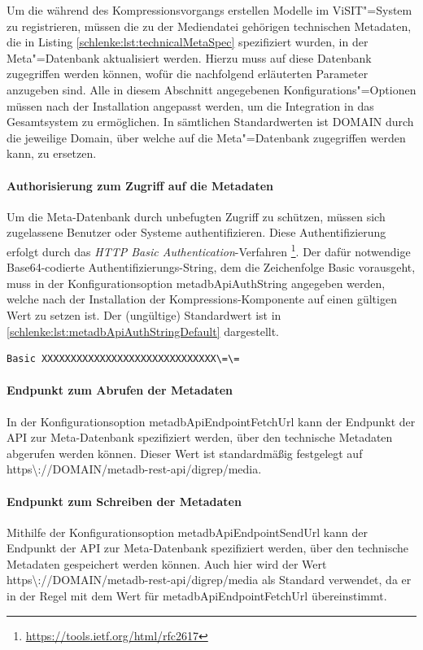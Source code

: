 Um die während des Kompressionsvorgangs erstellen Modelle im ViSIT"=System zu registrieren, müssen die zu der Mediendatei gehörigen technischen Metadaten, die in Listing \ref{schlenke:lst:technicalMetaSpec} spezifiziert wurden, in der Meta"=Datenbank aktualisiert werden. Hierzu muss auf diese Datenbank zugegriffen werden können, wofür die nachfolgend erläuterten Parameter anzugeben sind. Alle in diesem Abschnitt angegebenen Konfigurations"=Optionen müssen nach der Installation angepasst werden, um die Integration in das Gesamtsystem zu ermöglichen. In sämtlichen Standardwerten ist {\ttfamily DOMAIN} durch die jeweilige Domain, über welche auf die Meta"=Datenbank zugegriffen werden kann, zu ersetzen.

\paragraph{Authorisierung zum Zugriff auf die Metadaten} Um die Meta-Datenbank durch unbefugten Zugriff zu schützen, müssen sich zugelassene Benutzer oder Systeme authentifizieren. Diese Authentifizierung erfolgt durch das \emph{HTTP Basic Authentication}-Verfahren \footnote{\url{https://tools.ietf.org/html/rfc2617}}. Der dafür notwendige Base64-codierte Authentifizierungs-String, dem die Zeichenfolge {\ttfamily Basic } vorausgeht, muss in der Konfigurationsoption {\ttfamily metadb\-Api\-Auth\-String} angegeben werden, welche nach der Installation der Kompressions-Komponente auf einen gültigen Wert zu setzen ist. Der (ungültige) Standardwert ist in \autoref{schlenke:lst:metadbApiAuthStringDefault} dargestellt.

\begin{lstlisting}[caption={Standardwert für die Konfigurationsoption {\ttfamily metadb\-Api\-Auth\-String}},label=schlenke:lst:metadbApiAuthStringDefault]
	Basic XXXXXXXXXXXXXXXXXXXXXXXXXXXXXX\=\=
\end{lstlisting}

\paragraph{Endpunkt zum Abrufen der Metadaten} In der Konfigurationsoption {\ttfamily metadb\-Api\-Endpoint\-Fetch\-Url} kann der Endpunkt der API zur Meta-Datenbank spezifiziert werden, über den technische Metadaten abgerufen werden können. Dieser Wert ist standardmäßig festgelegt auf {\ttfamily https\textbackslash ://DOMAIN/metadb-rest-api/digrep/media}.

\paragraph{Endpunkt zum Schreiben der Metadaten} Mithilfe der Konfigurationsoption {\ttfamily metadb\-Api\-Endpoint\-Send\-Url} kann der Endpunkt der API zur Meta-Datenbank spezifiziert werden, über den technische Metadaten gespeichert werden können. Auch hier wird der Wert {\ttfamily https\textbackslash ://DOMAIN/metadb-rest-api/digrep/media} als Standard verwendet, da er in der Regel mit dem Wert für {\ttfamily metadb\-Api\-Endpoint\-Fetch\-Url} übereinstimmt.

